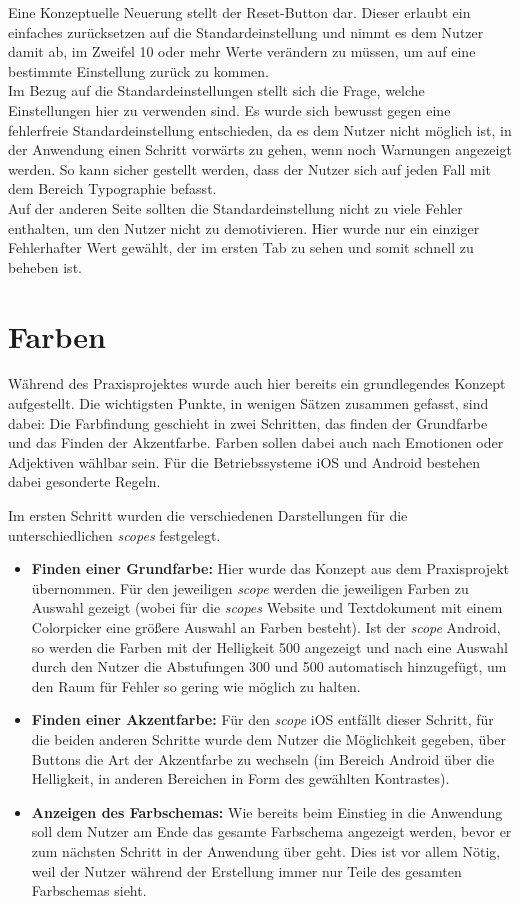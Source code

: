 Eine Konzeptuelle Neuerung stellt der Reset-Button dar. Dieser erlaubt ein einfaches zurücksetzen auf die Standardeinstellung und nimmt es dem Nutzer damit ab, im Zweifel 10 oder mehr Werte verändern zu müssen, um auf eine bestimmte Einstellung zurück zu kommen.\\
Im Bezug auf die Standardeinstellungen stellt sich die Frage, welche Einstellungen hier zu verwenden sind. Es wurde sich bewusst gegen eine fehlerfreie Standardeinstellung entschieden, da es dem Nutzer nicht möglich ist, in der Anwendung einen Schritt vorwärts zu gehen, wenn noch Warnungen angezeigt werden. So kann sicher gestellt werden, dass der Nutzer sich auf jeden Fall mit dem Bereich Typographie befasst.\\
Auf der anderen Seite sollten die Standardeinstellung nicht zu viele Fehler enthalten, um den Nutzer nicht zu demotivieren. Hier wurde nur ein einziger Fehlerhafter Wert gewählt, der im ersten Tab zu sehen und somit schnell zu beheben ist.\\

\section{Farben}
Während des Praxisprojektes wurde auch hier bereits ein grundlegendes Konzept aufgestellt. Die wichtigsten Punkte, in wenigen Sätzen zusammen gefasst, sind dabei:
Die Farbfindung geschieht in zwei Schritten, das finden der Grundfarbe und das Finden der Akzentfarbe. Farben sollen dabei auch nach Emotionen oder Adjektiven wählbar sein. Für die Betriebssysteme iOS und Android bestehen dabei gesonderte Regeln. \cite{PoplawskiPP}

Im ersten Schritt wurden die verschiedenen Darstellungen für die unterschiedlichen \textit{scopes} festgelegt.

\begin{itemize}
  \item \textbf{Finden einer Grundfarbe:} Hier wurde das Konzept aus dem Praxisprojekt übernommen. Für den jeweiligen \textit{scope} werden die jeweiligen Farben zu Auswahl gezeigt (wobei für die \textit{scopes} Website und Textdokument mit einem Colorpicker eine größere Auswahl an Farben besteht). Ist der \textit{scope} Android, so werden die Farben mit der Helligkeit 500 angezeigt und nach eine Auswahl durch den Nutzer die Abstufungen 300 und 500 automatisch hinzugefügt, um den Raum für Fehler so gering wie möglich zu halten.
  \item \textbf{Finden einer Akzentfarbe:} Für den \textit{scope} iOS entfällt dieser Schritt, für die beiden anderen Schritte wurde dem Nutzer die Möglichkeit gegeben, über Buttons die Art der Akzentfarbe zu wechseln (im Bereich Android über die Helligkeit, in anderen Bereichen in Form des gewählten Kontrastes).
  \item \textbf{Anzeigen des Farbschemas:} Wie bereits beim Einstieg in die Anwendung soll dem Nutzer am Ende das gesamte Farbschema angezeigt werden, bevor er zum nächsten Schritt in der Anwendung über geht. Dies ist vor allem Nötig, weil der Nutzer während der Erstellung immer nur Teile des gesamten Farbschemas sieht.
\end{itemize}

